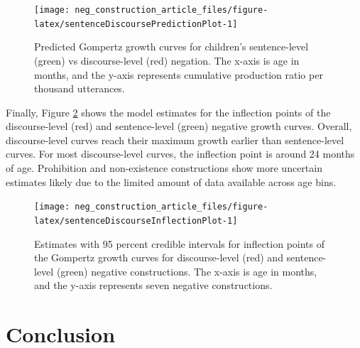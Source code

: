 \documentclass[
  man,floatsintext]{apa6}
\begin{document}
\begin{figure}[H]

{\centering \texttt{[image: neg\_construction\_article\_files/figure-latex/sentenceDiscoursePredictionPlot-1]} 

}

\caption{Predicted Gompertz growth curves for children's sentence-level (green) vs discourse-level (red) negation. The x-axis is age in months, and the y-axis represents cumulative production ratio per thousand utterances.}\label{fig:sentenceDiscoursePredictionPlot}
\end{figure}

Finally, Figure \ref{fig:sentenceDiscourseInflectionPlot} shows the model estimates for the inflection points of the discourse-level (red) and sentence-level (green) negative growth curves. Overall, discourse-level curves reach their maximum growth earlier than sentence-level curves. For most discourse-level curves, the inflection point is around 24 months of age. Prohibition and non-existence constructions show more uncertain estimates likely due to the limited amount of data available across age bins.

\begin{figure}[H]

{\centering \texttt{[image: neg\_construction\_article\_files/figure-latex/sentenceDiscourseInflectionPlot-1]} 

}

\caption{Estimates with 95 percent credible intervals for inflection points of the Gompertz growth curves for discourse-level (red) and sentence-level (green) negative constructions. The x-axis is age in months, and the y-axis represents seven negative constructions.}\label{fig:sentenceDiscourseInflectionPlot}
\end{figure}

\hypertarget{conclusion}{%
\section{Conclusion}\label{conclusion}}
\end{document}
